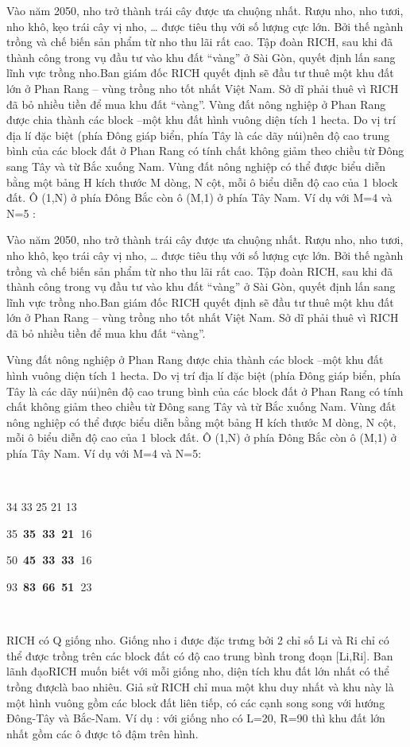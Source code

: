 

Vào năm 2050, nho trở thành trái cây được ưa chuộng nhất. Rượu nho, nho tươi, nho khô, kẹo trái cây vị nho, … được tiêu thụ với số lượng cực lớn. Bởi thế ngành trồng và chế biến sản phẩm từ nho thu lãi rất cao. Tập đoàn RICH, sau khi đã thành công trong vụ đầu tư vào khu đất “vàng” ở Sài Gòn, quyết định lấn sang lĩnh vực trồng nho.Ban giám đốc RICH quyết định sẽ đầu tư thuê một khu đất lớn ở Phan Rang – vùng trồng nho tốt nhất Việt Nam. Sở dĩ phải thuê vì RICH đã bỏ nhiều tiền để mua khu đất “vàng”. Vùng đất nông nghiệp ở Phan Rang được chia thành các block –một khu đất hình vuông diện tích 1 hecta. Do vị trí địa lí đặc biệt (phía Đông giáp biển, phía Tây là các dãy núi)nên độ cao trung bình của các block đất ở Phan Rang có tính chất không giảm theo chiều từ Đông sang Tây và từ Bắc xuống Nam. Vùng đất nông nghiệp có thể được biểu diễn bằng một bảng H kích thước M dòng, N cột, mỗi ô biểu diễn độ cao của 1 block đất. Ô (1,N) ở phía Đông Bắc còn ô (M,1) ở phía Tây Nam. Ví dụ với M=4 và N=5 :

Vào năm 2050, nho trở thành trái cây được ưa chuộng nhất. Rượu nho, nho tươi, nho khô, kẹo trái cây vị nho, … được tiêu thụ với số lượng cực lớn. Bởi thế ngành trồng và chế biến sản phẩm từ nho thu lãi rất cao. Tập đoàn RICH, sau khi đã thành công trong vụ đầu tư vào khu đất “vàng” ở Sài Gòn, quyết định lấn sang lĩnh vực trồng nho.Ban giám đốc RICH quyết định sẽ đầu tư thuê một khu đất lớn ở Phan Rang – vùng trồng nho tốt nhất Việt Nam. Sở dĩ phải thuê vì RICH đã bỏ nhiều tiền để mua khu đất “vàng”.

Vùng đất nông nghiệp ở Phan Rang được chia thành các block –một khu đất hình vuông diện tích 1 hecta. Do vị trí địa lí đặc biệt (phía Đông giáp biển, phía Tây là các dãy núi)nên độ cao trung bình của các block đất ở Phan Rang có tính chất không giảm theo chiều từ Đông sang Tây và từ Bắc xuống Nam. Vùng đất nông nghiệp có thể được biểu diễn bằng một bảng H kích thước M dòng, N cột, mỗi ô biểu diễn độ cao của 1 block đất. Ô (1,N) ở phía Đông Bắc còn ô (M,1) ở phía Tây Nam. Ví dụ với M=4 và N=5:

 

34 33 25 21 13

35 \textbf{35 }\textbf{33 }\textbf{21 }16

50 \textbf{45 }\textbf{33 }\textbf{33 }16

93 \textbf{83 }\textbf{66 }\textbf{51 }23

 

RICH có Q giống nho. Giống nho i được đặc trưng bởi 2 chỉ số Li và Ri chỉ có thể được trồng trên các block đất có độ cao trung bình trong đoạn [Li,Ri]. Ban lãnh đạoRICH muốn biết với mỗi giống nho, diện tích khu đất lớn nhất có thể trồng đượclà bao nhiêu. Giả sử RICH chỉ mua một khu duy nhất và khu này là một hình vuông gồm các block đất liên tiếp, có các cạnh song song với hướng Đông-Tây và Bắc-Nam. Ví dụ : với giống nho có L=20, R=90 thì khu đất lớn nhất gồm các ô được tô đậm trên hình.


